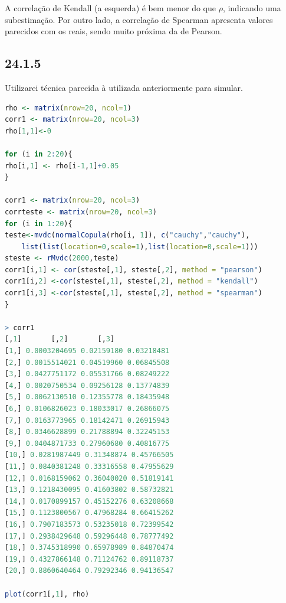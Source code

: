 \documentclass[12pt]{article}
\begin{document}
A correlação de Kendall (a esquerda) é bem menor do que $\rho$, indicando uma subestimação. Por outro lado, a correlação de Spearman apresenta valores parecidos com os reais, sendo muito próxima da de Pearson.

\subsection*{24.1.5}
Utilizarei técnica parecida à utilizada anteriormente para simular.

\begin{lstlisting}[language=R]
rho <- matrix(nrow=20, ncol=1)
corr1 <- matrix(nrow=20, ncol=3)
rho[1,1]<-0

for (i in 2:20){
rho[i,1] <- rho[i-1,1]+0.05
}

corr1 <- matrix(nrow=20, ncol=3)
corrteste <- matrix(nrow=20, ncol=3)
for (i in 1:20){
teste<-mvdc(normalCopula(rho[i, 1]), c("cauchy","cauchy"),
	list(list(location=0,scale=1),list(location=0,scale=1)))
steste <- rMvdc(2000,teste)
corr1[i,1] <- cor(steste[,1], steste[,2], method = "pearson")
corr1[i,2] <-cor(steste[,1], steste[,2], method = "kendall")
corr1[i,3] <-cor(steste[,1], steste[,2], method = "spearman")
}

> corr1
[,1]       [,2]       [,3]
[1,] 0.0003204695 0.02159180 0.03218481
[2,] 0.0015514021 0.04519960 0.06845508
[3,] 0.0427751172 0.05531766 0.08249222
[4,] 0.0020750534 0.09256128 0.13774839
[5,] 0.0062130510 0.12355778 0.18435948
[6,] 0.0106826023 0.18033017 0.26866075
[7,] 0.0163773965 0.18142471 0.26915943
[8,] 0.0346628899 0.21788894 0.32245153
[9,] 0.0404871733 0.27960680 0.40816775
[10,] 0.0281987449 0.31348874 0.45766505
[11,] 0.0840381248 0.33316558 0.47955629
[12,] 0.0168159062 0.36040020 0.51819141
[13,] 0.1218430095 0.41603802 0.58732821
[14,] 0.0170899157 0.45152276 0.63208668
[15,] 0.1123800567 0.47968284 0.66415262
[16,] 0.7907183573 0.53235018 0.72399542
[17,] 0.2938429648 0.59296448 0.78777492
[18,] 0.3745318990 0.65978989 0.84870474
[19,] 0.4327866148 0.71124762 0.89118737
[20,] 0.8860640464 0.79292346 0.94136547

plot(corr1[,1], rho)
\end{lstlisting}
\end{document}
